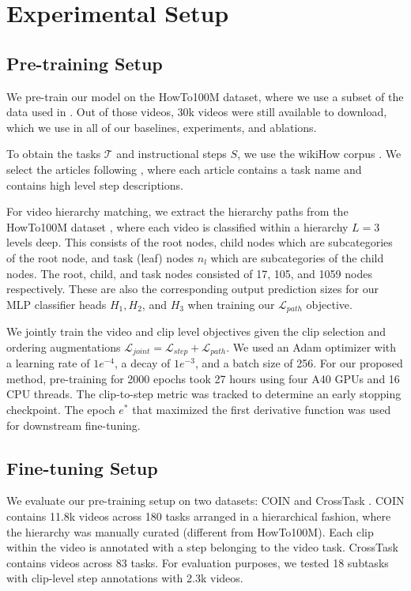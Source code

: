 \section{Experimental Setup}

\subsection{Pre-training Setup}
We pre-train our model on the HowTo100M dataset, where we use a subset of the data used in \cite{bertasius2021space}. Out of those videos, 30k videos were still available to download, which we use in all of our baselines, experiments, and ablations. 

To obtain the tasks $\mathcal{T}$ and instructional steps $S$, we use the wikiHow corpus \citep{koupaee2018wikihow}. We select the articles following \cite{paprika}, where each article contains a task name and contains high level step descriptions. 

For video hierarchy matching, we extract the hierarchy paths from the HowTo100M dataset \citep{miech19howto100m}, where each video is classified within a hierarchy $L = 3$ levels deep. This consists of the root nodes, child nodes which are subcategories of the root node, and task (leaf) nodes $n_l$ which are subcategories of the child nodes. The root, child, and task nodes consisted of 17, 105, and 1059 nodes respectively. These are also the corresponding output prediction sizes for our MLP classifier heads $H_1, H_2$, and $H_3$ when training our $\mathcal{L}_{path}$ objective.

We jointly train the video and clip level objectives given the clip selection and ordering augmentations $\mathcal{L}_{joint} = \mathcal{L}_{step} + \mathcal{L}_{path}$. We used an Adam optimizer \citep{kingma2014adam} with a learning rate of $1e^{-4}$, a decay of $1e^{-3}$, and a batch size of 256. For our proposed method, pre-training for 2000 epochs took 27 hours using four A40 GPUs and 16 CPU threads. The clip-to-step metric was tracked to determine an early stopping checkpoint. The epoch $e^*$ that maximized the first derivative function was used for downstream fine-tuning. 

\subsection{Fine-tuning Setup}

We evaluate our pre-training setup on two datasets: COIN \citep{tang2019coin} and CrossTask \citep{zhukov2019cross}. COIN contains 11.8k videos across 180 tasks arranged in a hierarchical fashion, where the hierarchy was manually curated (different from HowTo100M). Each clip within the video is annotated with a step belonging to the video task. CrossTask contains videos across 83 tasks. For evaluation purposes, we tested 18 subtasks with clip-level step annotations with 2.3k videos. 

